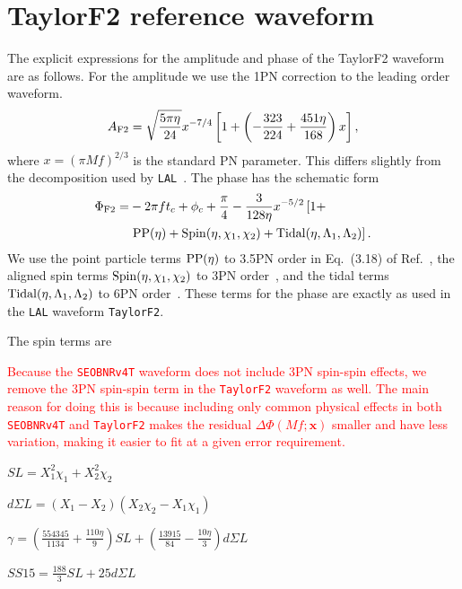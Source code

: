 \documentclass[prd,aps,letter,twocolumn,floatfix,notitlepage,nofootinbib]{revtex4-1}
\def\bx{\mathbf{x}}
\newcommand{\red}[1]{\textcolor{red}{#1}}
\begin{document}
\appendix
\section{TaylorF2 reference waveform}
\label{sec:taylorf2}

The explicit expressions for the amplitude and phase of the TaylorF2 waveform are as follows. For the amplitude we use the 1PN correction to the leading order waveform.
\begin{equation}
A_{\rm F2} = \sqrt{\frac{5\pi\eta}{24}} x^{-7/4} \left[ 1 + \left(-\frac{323}{224} + \frac{451\eta}{168} \right)x \right],
\end{equation}
where $x=(\pi M f)^{2/3}$ is the standard PN parameter. This differs slightly from the decomposition used by \texttt{LAL}~\cite{lal}. The phase has the schematic form
\begin{align}
\Phi_{\rm F2} =& -2\pi f t_c + \phi_c + \frac{\pi}{4} - \frac{3}{128\eta}x^{-5/2} \left[1 + \right. \\
                        & \left. {\rm PP}(\eta) + {\rm Spin}(\eta, \chi_1, \chi_2) + {\rm Tidal}(\eta, \Lambda_1, \Lambda_2)  \right].
\end{align}
We use the point particle terms ${\rm PP}(\eta)$ to 3.5PN order in Eq.~(3.18) of Ref.~\cite{BuonannoIyerOchsner2009}, the aligned spin terms ${\rm Spin}(\eta, \chi_1, \chi_2)$ to 3PN order~\cite{BoheMarsatBlanchet2013}, and the tidal terms ${\rm Tidal}(\eta, \Lambda_1, \Lambda_2)$ to 6PN order~\cite{VinesFlanaganHinderer2011}. These terms for the phase are exactly as used in the \texttt{LAL} waveform \texttt{TaylorF2}. 

The spin terms are

\red{Because the \texttt{SEOBNRv4T} waveform does not include 3PN spin-spin effects, we remove the 3PN spin-spin term in the \texttt{TaylorF2} waveform as well. The main reason for doing this is because including only common physical effects in both \texttt{SEOBNRv4T} and \texttt{TaylorF2} makes the residual $\Delta\Phi(Mf; \bx)$ smaller and have less variation, making it easier to fit at a given error requirement.}


$SL = X_1^2\chi_1 + X_2^2\chi_2$

$d\Sigma L = (X_1-X_2)(X_2\chi_2-X_1\chi_1)$

$\gamma = \left(\frac{554345}{1134}+\frac{110\eta}{9}\right)SL + \left(\frac{13915}{84} - \frac{10\eta}{3}\right)d\Sigma L$

$SS15 = \frac{188}{3}SL + 25 d\Sigma L$
\end{document}
